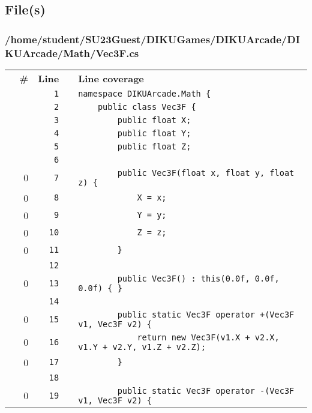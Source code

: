 \documentclass[a4paper,landscape,10pt]{article}
\begin{document}
\subsection{File(s)}
\subsubsection{/home/student/SU23Guest/DIKUGames/DIKUArcade/DIKUArcade/Math/Vec3F.cs}
\begin{longtable}[l]{lrrll}
\textbf{} & \textbf{\#} & \textbf{Line} & \textbf{} & \textbf{Line coverage}\\
\cellcolor{gray} &  & \verb~1~ & & \verb~namespace DIKUArcade.Math {~\\
\cellcolor{gray} &  & \verb~2~ & & \verb~    public class Vec3F {~\\
\cellcolor{gray} &  & \verb~3~ & & \verb~        public float X;~\\
\cellcolor{gray} &  & \verb~4~ & & \verb~        public float Y;~\\
\cellcolor{gray} &  & \verb~5~ & & \verb~        public float Z;~\\
\cellcolor{gray} &  & \verb~6~ & & \verb~~\\
\cellcolor{red} & 0 & \verb~7~ & & \verb~        public Vec3F(float x, float y, float z) {~\\
\cellcolor{red} & 0 & \verb~8~ & & \verb~            X = x;~\\
\cellcolor{red} & 0 & \verb~9~ & & \verb~            Y = y;~\\
\cellcolor{red} & 0 & \verb~10~ & & \verb~            Z = z;~\\
\cellcolor{red} & 0 & \verb~11~ & & \verb~        }~\\
\cellcolor{gray} &  & \verb~12~ & & \verb~~\\
\cellcolor{red} & 0 & \verb~13~ & & \verb~        public Vec3F() : this(0.0f, 0.0f, 0.0f) { }~\\
\cellcolor{gray} &  & \verb~14~ & & \verb~~\\
\cellcolor{red} & 0 & \verb~15~ & & \verb~        public static Vec3F operator +(Vec3F v1, Vec3F v2) {~\\
\cellcolor{red} & 0 & \verb~16~ & & \verb~            return new Vec3F(v1.X + v2.X, v1.Y + v2.Y, v1.Z + v2.Z);~\\
\cellcolor{red} & 0 & \verb~17~ & & \verb~        }~\\
\cellcolor{gray} &  & \verb~18~ & & \verb~~\\
\cellcolor{red} & 0 & \verb~19~ & & \verb~        public static Vec3F operator -(Vec3F v1, Vec3F v2) {~\\

\end{longtable}
\end{document}
